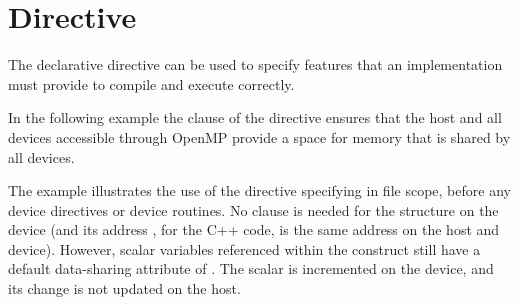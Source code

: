 \section{ Directive}
\label{sec:requires}

The declarative  directive can be used to 
specify features that an implementation must provide to compile and 
execute correctly.

In the following example the  clause 
of the  directive ensures that the host and all 
devices accessible through OpenMP provide a  space
for memory that is shared by all devices.

The example illustrates the use of the  directive specifying
 in file scope, before any device 
directives or device routines. No  clause is needed for
the  structure on the device (and its address , for the C++ code,
is the same address on the host and device).
However, scalar variables referenced within the 
construct still have a default data-sharing attribute of .
The  scalar is incremented on the device, and its change is
not updated on the host.



